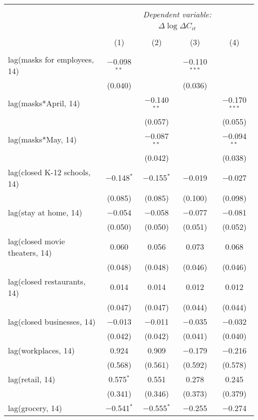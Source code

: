 \begin{tabular}{@{\extracolsep{1pt}}lcccc} 
\\[-1.8ex]\hline 
\hline \\[-1.8ex] 
 & \multicolumn{4}{c}{\textit{Dependent variable:}} \\ 
\cline{2-5} 
 & \multicolumn{4}{c}{$\Delta \log \Delta C_{it}$} \\ 
\\[-1.8ex] & (1) & (2) & (3) & (4)\\ 
\hline \\[-1.8ex] 
 lag(masks for employees, 14) & $-$0.098$^{**}$ &  & $-$0.110$^{***}$ &  \\ 
  & (0.040) &  & (0.036) &  \\ 
  lag(masks*April, 14) &  & $-$0.140$^{**}$ &  & $-$0.170$^{***}$ \\ 
  &  & (0.057) &  & (0.055) \\ 
  lag(masks*May, 14) &  & $-$0.087$^{**}$ &  & $-$0.094$^{**}$ \\ 
  &  & (0.042) &  & (0.038) \\ 
  lag(closed K-12 schools, 14) & $-$0.148$^{*}$ & $-$0.155$^{*}$ & $-$0.019 & $-$0.027 \\ 
  & (0.085) & (0.085) & (0.100) & (0.098) \\ 
  lag(stay at home, 14) & $-$0.054 & $-$0.058 & $-$0.077 & $-$0.081 \\ 
  & (0.050) & (0.050) & (0.051) & (0.052) \\ 
  lag(closed movie theaters, 14) & 0.060 & 0.056 & 0.073 & 0.068 \\ 
  & (0.048) & (0.048) & (0.046) & (0.046) \\ 
  lag(closed restaurants, 14) & 0.014 & 0.014 & 0.012 & 0.012 \\ 
  & (0.047) & (0.047) & (0.044) & (0.044) \\ 
  lag(closed businesses, 14) & $-$0.013 & $-$0.011 & $-$0.035 & $-$0.032 \\ 
  & (0.042) & (0.042) & (0.041) & (0.040) \\ 
  lag(workplaces, 14) & 0.924 & 0.909 & $-$0.179 & $-$0.216 \\ 
  & (0.568) & (0.561) & (0.592) & (0.578) \\ 
  lag(retail, 14) & 0.575$^{*}$ & 0.551 & 0.278 & 0.245 \\ 
  & (0.341) & (0.346) & (0.373) & (0.379) \\ 
  lag(grocery, 14) & $-$0.541$^{*}$ & $-$0.555$^{*}$ & $-$0.255 & $-$0.274 \\ 

\end{tabular}
